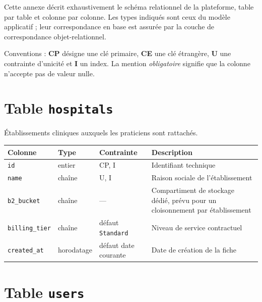 Cette annexe décrit exhaustivement le schéma relationnel de la plateforme, table par
table et colonne par colonne. Les types indiqués sont ceux du modèle applicatif ; leur
correspondance en base est assurée par la couche de correspondance objet-relationnel.

Conventions : \textbf{CP} désigne une clé primaire, \textbf{CE} une clé étrangère,
\textbf{U} une contrainte d'unicité et \textbf{I} un index. La mention
\emph{obligatoire} signifie que la colonne n'accepte pas de valeur nulle.

\section{Table \texttt{hospitals}}

Établissements cliniques auxquels les praticiens sont rattachés.

\begin{table}[H]
\centering
\small
\begin{tabular}{@{}lllL{6.0cm}@{}}
\toprule
\textbf{Colonne} & \textbf{Type} & \textbf{Contrainte} & \textbf{Description} \\
\midrule
\texttt{id}            & entier    & CP, I & Identifiant technique \\
\texttt{name}          & chaîne    & U, I  & Raison sociale de l'établissement \\
\texttt{b2\_bucket}    & chaîne    & ---   & Compartiment de stockage dédié, prévu pour
                                             un cloisonnement par établissement \\
\texttt{billing\_tier} & chaîne    & défaut \texttt{Standard} & Niveau de service
                                             contractuel \\
\texttt{created\_at}   & horodatage& défaut date courante & Date de création de la
                                             fiche \\
\bottomrule
\end{tabular}
\end{table}

\section{Table \texttt{users}}

